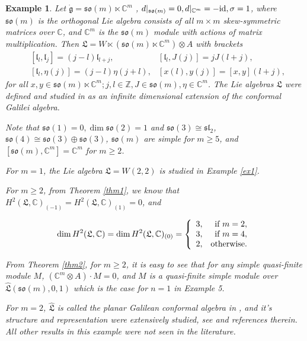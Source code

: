 \documentclass[1p]{elsarticle}
\numberwithin{equation}{section}
\def\sl{\mathfrak{sl}}
\def\dg{\dot{\mathfrak{g}}}
\def\fL{\mathfrak{L}}
\def\bC{\mathbb{C}}
\def\bZ{\mathbb{Z}}
\def\fl{\mathfrak{l}}
\def\hL{\hat{\fL}}
\def\so{\mathfrak{so}}
\newtheorem{exam}{Example}
\begin{document}
\begin{exam}\label{5.6} Let $\dg=\so(m)\ltimes \bC^m$ , $d|_{\so(m)}=0, d|_{\bC^m}=-{\rm id},  \sigma=1$,  where $\so(m)$ is the orthogonal Lie algebra consists of all $m\times m$ skew-symmetric matrices over $\bC$, and $\bC^m$ is the $\so(m)$ module with actions of matrix multiplication. Then $\fL=W\ltimes (\so(m) \ltimes \bC^m)\otimes A$ with brackets
\begin{align*}&[\fl_l,\fl_j]=(j-l)\fl_{l+j}, &[\fl_l, J(j)]=jJ(l+j),\\
 &[\fl_l, \eta(j)]=(j-l)\eta(j+l),& [x(l),y(j)]=[x,y](l+j),\end{align*}
 for all $x,y\in \so(m)\ltimes \bC^m ; j,l\in \bZ, J\in \so(m),\eta\in \bC^m$. The Lie algebras $\fL$ were defined and studied in \cite{BG} as an infinite dimensional extension of the conformal Galilei algebra.

Note that $\so(1)=0,\dim \so(2)=1$ and $\so(3)\cong \sl_2$, $\so(4)\cong \so(3)\oplus \so(3)$, $\so(m)$ are simple for $m\ge 5$, and $[\so(m),\bC^m]=\bC^m$ for   $m\ge 2$.

For $m=1$, the Lie algebra $\fL=W(2,2)$ is studied in Example \ref{ex1}.

For $m\ge 2$, from Theorem \ref{thm1}, we know that $ H^2(\fL,\bC)_{(-1)}= H^2(\fL,\bC)_{(1)}=0$, and

$$\dim H^2(\fL,\bC)=\dim H^2(\fL,\bC)_{(0)}=\left\{\begin{array}{lr}3,& \text{\rm if }m=2, \\ 3,& \text{\rm if }m=4,\\2,& {\rm otherwise}. \end{array}\right.$$

From Theorem \ref{thm2}, for $m\ge 2$, it is easy to see that for any simple quasi-finite module $M$, $(\bC^m\otimes A) \cdot M=0$, and $M$ is a quasi-finite simple module over $\hL(\so(m),0,1)$ which is the case for $n=1$ in Example 5. 

 For $m=2$, $\hL$ is called the  planar Galilean conformal algebra in \cite{Ai}, and it's structure and representation were extensively studied, see \cite{GLP, GG}and references therein. All other results in this example were not seen in the literature.\end{exam}
\end{document}
